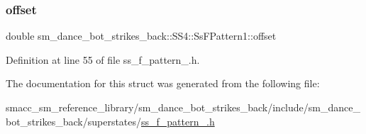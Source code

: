 \subsubsection{\texorpdfstring{offset}{offset}}
{\footnotesize\ttfamily double sm\+\_\+dance\+\_\+bot\+\_\+strikes\+\_\+back\+::\+S\+S4\+::\+Ss\+F\+Pattern1\+::offset}



Definition at line 55 of file ss\+\_\+f\+\_\+pattern\+\_.\+h.



The documentation for this struct was generated from the following file\+:\begin{DoxyCompactItemize}
\item 
smacc\+\_\+sm\+\_\+reference\+\_\+library/sm\+\_\+dance\+\_\+bot\+\_\+strikes\+\_\+back/include/sm\+\_\+dance\+\_\+bot\+\_\+strikes\+\_\+back/superstates/\hyperlink{sm__dance__bot__strikes__back_2include_2sm__dance__bot__strikes__back_2superstates_2ss__f__pattern__1_8h}{ss\+\_\+f\+\_\+pattern\+\_.\+h}\end{DoxyCompactItemize}
